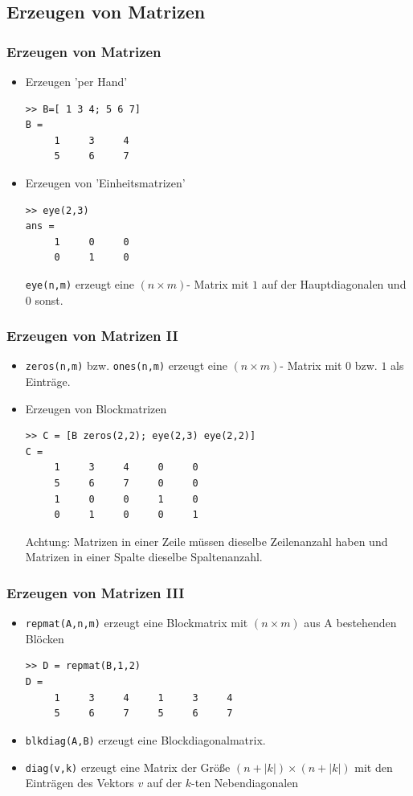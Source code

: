 \subsection{Erzeugen von Matrizen}
%
%
\begin{frame}[fragile]\frametitle{Erzeugen von Matrizen}
\begin{itemize}
\item Erzeugen 'per Hand'
\begin{lstlisting}
>> B=[ 1 3 4; 5 6 7]
B =
     1     3     4
     5     6     7
\end{lstlisting}
\item Erzeugen von 'Einheitsmatrizen' 
\begin{lstlisting}
>> eye(2,3)
ans =
     1     0     0
     0     1     0
\end{lstlisting}
\lstinline!eye(n,m)! erzeugt eine $(n \times m)$- Matrix mit $1$ auf der
Hauptdiagonalen und 0 sonst.
\end{itemize}
\end{frame} 
%
%
\begin{frame}[fragile]\frametitle{Erzeugen von Matrizen II}
\begin{itemize}
\item \lstinline!zeros(n,m)! bzw. \lstinline!ones(n,m)! erzeugt eine $(n \times
  m)$- Matrix mit $0$ bzw. $1$ als Einträge.
\item Erzeugen von Blockmatrizen
\begin{lstlisting}
>> C = [B zeros(2,2); eye(2,3) eye(2,2)]
C =
     1     3     4     0     0
     5     6     7     0     0
     1     0     0     1     0
     0     1     0     0     1
\end{lstlisting}
\alert{Achtung:} Matrizen in einer Zeile müssen dieselbe
Zeilenanzahl haben und Matrizen in einer Spalte dieselbe Spaltenanzahl.
\end{itemize}
\end{frame} 
%
%
\begin{frame}[fragile]\frametitle{Erzeugen von Matrizen III}
\begin{itemize}
\item \lstinline!repmat(A,n,m)! erzeugt eine Blockmatrix mit $(n \times m)$
  aus A bestehenden Blöcken
\begin{lstlisting}
>> D = repmat(B,1,2)
D =
     1     3     4     1     3     4
     5     6     7     5     6     7
\end{lstlisting}
\item \lstinline!blkdiag(A,B)! erzeugt eine Blockdiagonalmatrix.
\item \lstinline!diag(v,k)! erzeugt eine Matrix der Größe $(n+|k|) \times
  (n+|k|)$ mit den Einträgen des Vektors $v$ auf der $k$-ten Nebendiagonalen 
\end{itemize}
\end{frame}

